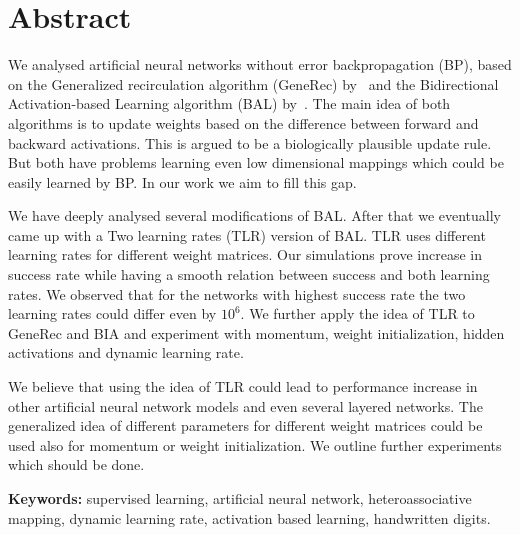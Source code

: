 
\section*{Abstract}

We analysed artificial neural networks without error backpropagation (BP), based on the Generalized recirculation algorithm (GeneRec) by~\citet{o1996bio} and the Bidirectional Activation-based Learning algorithm (BAL) by~\citet{farkas2013bal}. The main idea of both algorithms is to update weights based on the difference between forward and backward activations. This is argued to be a biologically plausible update rule. But both have problems learning even low dimensional mappings which could be easily learned by BP. In our work we aim to fill this gap. 

We have deeply analysed several modifications of BAL. After that we eventually came up with a Two learning rates (TLR) version of BAL. TLR uses different learning rates for different weight matrices. Our simulations prove increase in success rate while having a smooth relation between success and both learning rates. We observed that for the networks with highest success rate the two learning rates could differ even by $10^6$. We further apply the idea of TLR to GeneRec and BIA and experiment with momentum, weight initialization, hidden activations and dynamic learning rate. 

We believe that using the idea of TLR could lead to performance increase in other artificial neural network models and even several layered networks. The generalized idea of different parameters for different weight matrices could be used also for momentum or weight initialization. We outline further experiments which should be done. 

\begin{flushleft}
  \textbf{Keywords:} supervised learning, artificial neural network, heteroassociative mapping, dynamic learning rate, activation based learning, handwritten digits. 
\end{flushleft}


